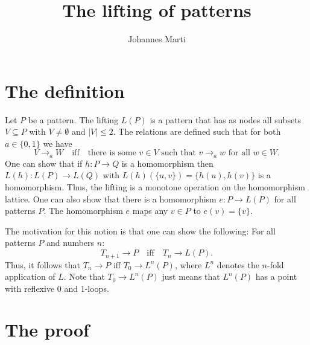 \documentclass[a4paper]{article}
\title{The lifting of patterns}
\author{Johannes Marti}
\renewcommand{\iff}{\quad \mbox{iff} \quad}
\begin{document}


\section{The definition}

Let $P$ be a pattern. The lifting $L(P)$ is a pattern that has as nodes
all subsets $V \subseteq P$ with $V \neq \emptyset$ and $|V| \leq 2$.
The relations are defined such that for both $a \in \{0,1\}$ we have
\[
 V \rightarrow_a W \iff \mbox{there is some } v \in V \mbox{ such that }
v \rightarrow_a w \mbox{ for all } w \in W.
\]
One can show that if $h : P \to Q$ is a homomorphism then $L(h) : L(P)
\to L(Q)$ with $L(h)(\{u,v\}) = \{h(u),h(v)\}$ is a homomorphism. Thus,
the lifting is a monotone operation on the homomorphism lattice. One can
also show that there is a homomorphism $e : P \to L(P)$ for all patterns
$P$. The homomorphism $e$ maps any $v \in P$ to $e(v) = \{v\}$.

The motivation for this notion is that one can show the following: For
all patterns $P$ and numbers $n$:
\begin{equation} \label{eq:lifting property}
 T_{n + 1} \to P \iff T_n \to L(P).
\end{equation}
Thus, it follows that $T_n \to P$ iff $T_0 \to L^n(P)$, where $L^n$
denotes the $n$-fold application of $L$. Note that $T_0 \to L^n(P)$ just
means that $L^n(P)$ has a point with reflexive $0$ and $1$-loops.


\section{The proof}
\end{document}
